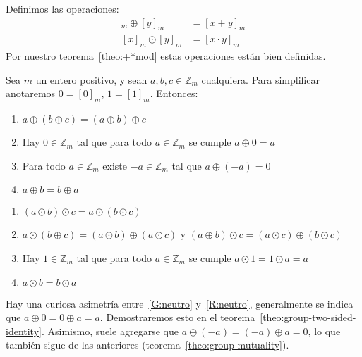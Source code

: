   Definimos las operaciones:
  \begin{align*}
    [x]_m \oplus [y]_m
      &= [x + y]_m \\
    [x]_m \odot	 [y]_m
      &= [x \cdot y]_m
  \end{align*}
  Por nuestro teorema~\ref{theo:+*mod}
  estas operaciones están bien definidas.
  \begin{theorem}
    \label{theo:mod-rules}
    Sea \(m\) un entero positivo,
    y sean \(a, b, c \in \mathbb{Z}_m\) cualquiera.
    Para simplificar anotaremos \(0 = [0]_m\), \(1 = [1]_m\).
    Entonces:
    \begin{enumerate}[label=\textbf{G\arabic{*}:}, ref=G\arabic{*}]
    \item\label{G:asociativa}
      \(a \oplus (b \oplus c) = (a \oplus b) \oplus c\)
    \item\label{G:neutro}
      Hay\/ \(0 \in \mathbb{Z}_m\)
      tal que para todo \(a \in \mathbb{Z}_m\)
      se cumple \(a \oplus 0 = a\)
    \item\label{G:inverso}
      Para todo \(a \in \mathbb{Z}_m\) existe \(-a \in \mathbb{Z}_m\)
      tal que \(a \oplus (-a) = 0\)
    \item\label{G:conmutativa}
      \(a \oplus b = b \oplus a\)
    \end{enumerate}
    \begin{enumerate}[label=\textbf{R\arabic{*}:}, ref=R\arabic{*}]
    \item\label{R:asociativa}
      \((a \odot b) \odot c = a \odot (b \odot c)\)
    \item\label{R:distributiva}
      \(a \odot (b \oplus c) = (a \odot b) \oplus (a \odot c)\)
      y
      \((a \oplus b) \odot c = (a \odot c) \oplus (b \odot c)\)
    \item\label{R:neutro}
      Hay\/ \(1 \in \mathbb{Z}_m\)
      tal que para todo \(a \in \mathbb{Z}_m\)
      se cumple \(a \odot 1 = 1 \odot a = a\)
    \item\label{R:conmutativa}
      \(a \odot b = b \odot a\)
    \end{enumerate}
  \end{theorem}
  Hay una curiosa asimetría entre~\ref{G:neutro} y~\ref{R:neutro},
  generalmente se indica que \(a \oplus 0 = 0 \oplus a = a\).
  Demostraremos esto en el teorema~\ref{theo:group-two-sided-identity}.
  Asimismo,
  suele agregarse que \(a \oplus (-a) = (-a) \oplus a = 0\),
  lo que también sigue de las anteriores
  (teorema~\ref{theo:group-mutuality}).
